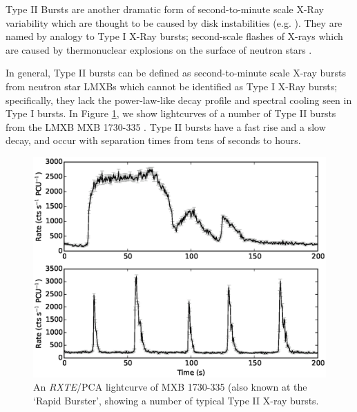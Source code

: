 \par Type II Bursts are another dramatic form of second-to-minute scale X-Ray variability which are thought to be caused by disk instabilities (e.g. \citealp{Lewin_TypeII}).  They are named by analogy to Type I X-Ray bursts; second-scale flashes of X-rays which are caused by thermonuclear explosions on the surface of neutron stars \citep{vanParadijs_TypeI,Lewin_Bursts}.
\par In general, Type II bursts can be defined as second-to-minute scale X-ray bursts from neutron star LMXBs which cannot be identified as Type I X-Ray bursts; specifically, they lack the power-law-like decay profile \citep{intZand_Decay} and spectral cooling \citep{Hoffman_T1Cool} seen in Type I bursts.  In Figure \ref{fig:BgB}, we show lightcurves of a number of Type II bursts from the LMXB MXB 1730-335 \citep{Bagnoli_PopStudy}.  Type II bursts have a fast rise and a slow decay, and occur with separation times from tens of seconds to hours.

\begin{figure}
  \centering
  \includegraphics[width=.9\linewidth, trim= 0mm 0mm 0mm 80mm,clip]{images/bagnoli_bursts.eps}
  \caption[An \textit{RXTE}/PCA lightcurve of the Rapid Burster, showing a number of typical Type II X-ray bursts.]{An \textit{RXTE}/PCA lightcurve of MXB 1730-335 (also known at the `Rapid Burster', showing a number of typical Type II X-ray bursts.}
  \label{fig:BgB}
\end{figure}

